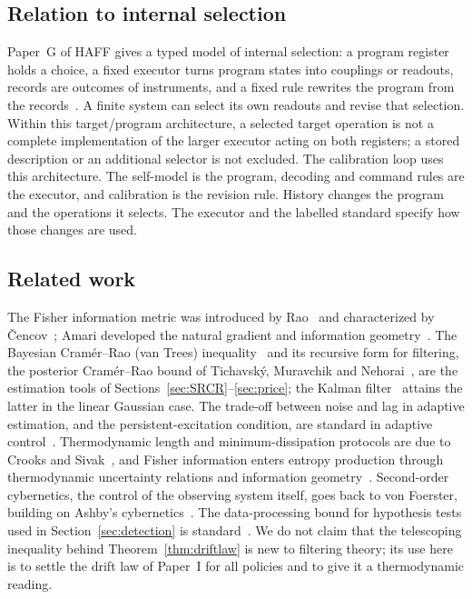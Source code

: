 \documentclass[12pt]{article}
\theoremstyle{definition}
\begin{document}
\subsection{Relation to internal selection}
\label{subsec:haff_g}

Paper~G of HAFF gives a typed model of internal selection: a program register holds a choice, a fixed executor turns program states into couplings or readouts, records are outcomes of instruments, and a fixed rule rewrites the program from the records~\cite{Liu2026HAFF_G}. A finite system can select its own readouts and revise that selection. Within this target/program architecture, a selected target operation is not a complete implementation of the larger executor acting on both registers; a stored description or an additional selector is not excluded. The calibration loop uses this architecture. The self-model is the program, decoding and command rules are the executor, and calibration is the revision rule. History changes the program and the operations it selects. The executor and the labelled standard specify how those changes are used.

\subsection{Related work}
\label{subsec:related}

The Fisher information metric was introduced by Rao~\cite{Rao1945} and characterized by \v{C}encov~\cite{Cencov1982}; Amari developed the natural gradient and information geometry~\cite{Amari1998,AmariNagaoka2000}. The Bayesian Cram\'er--Rao (van Trees) inequality~\cite{vanTrees1968} and its recursive form for filtering, the posterior Cram\'er--Rao bound of Tichavsk\'y, Muravchik and Nehorai~\cite{Tichavsky1998}, are the estimation tools of Sections~\ref{sec:SRCR}--\ref{sec:price}; the Kalman filter~\cite{Kalman1960} attains the latter in the linear Gaussian case. The trade-off between noise and lag in adaptive estimation, and the persistent-excitation condition, are standard in adaptive control~\cite{AstromWittenmark1995}. Thermodynamic length and minimum-dissipation protocols are due to Crooks and Sivak~\cite{Crooks2007,SivakCrooks2012}, and Fisher information enters entropy production through thermodynamic uncertainty relations and information geometry~\cite{BaratoSeifert2015,Ito2018}. Second-order cybernetics, the control of the observing system itself, goes back to von Foerster, building on Ashby's cybernetics~\cite{Ashby1956,vonFoerster2003}. The data-processing bound for hypothesis tests used in Section~\ref{sec:detection} is standard~\cite{CoverThomas2006}. We do not claim that the telescoping inequality behind Theorem~\ref{thm:driftlaw} is new to filtering theory; its use here is to settle the drift law of Paper~I for all policies and to give it a thermodynamic reading.
\end{document}
